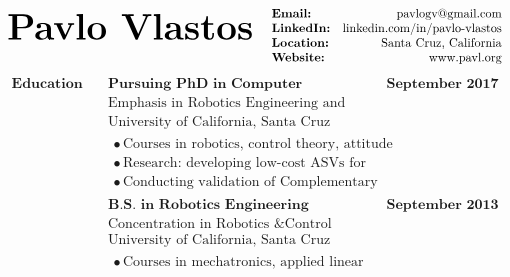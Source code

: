 \documentclass[paper=a4,fontsize=11pt]{article} %
\begin{document}
\begin{align*}
	\text{\fontsize{30}{36}\selectfont \textbf{Pavlo Vlastos}} & \hfill & \begin{array}{lr}
	\textbf{Email:} & \text{pavlogv@gmail.com}\\
	\textbf{LinkedIn:} & \text{linkedin.com/in/pavlo-vlastos}\\
	\textbf{Location:} & \text{Santa Cruz, California}\\
	\textbf{Website:} & \text{www.pavl.org}
	\end{array} 
\end{align*}
%
\begin{align*}
	\textbf{Education} &  \quad \textbf{Pursuing PhD in Computer Engineering} & \textbf{September 2017 - Current} \\
	& \quad \text{Emphasis in Robotics Engineering and Control Theory} & \\
	& \quad \text{University of California, Santa Cruz} & \\
	& \quad \begin{array}{l} 
		\bullet \, \text{Courses in robotics, control theory, attitude estimation, and embedded programming} \\
		\bullet \, \text{Research: developing low-cost ASVs for oceanography}\\
		\bullet \, \text{Conducting validation of Complementary Filter-based AHRS.}
	\end{array} & \\
	& \quad \textbf{B.S. in Robotics Engineering} & \textbf{September 2013 - June 2017} \\
	& \quad \text{Concentration in Robotics \& Control} & \\
	& \quad \text{University of California, Santa Cruz} & \\
	& \quad \begin{array}{l} 
	\bullet \, \text{Courses in mechatronics, applied linear algebra, and advanced feedback control}
	\end{array} & 
\end{align*}
\end{document}
